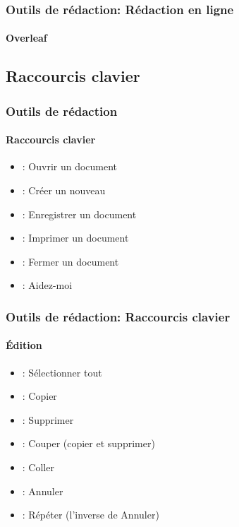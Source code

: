 \documentclass[xcolor=table]{beamer}
\begin{document}
\begin{frame}
\frametitle{Outils de rédaction: Rédaction en ligne}
\framesubtitle{Overleaf}


\end{frame}

\subsection{Raccourcis clavier}

\begin{frame}
\frametitle{Outils de rédaction}
\framesubtitle{Raccourcis clavier}

\begin{itemize}
	\item {}: Ouvrir un document
	\item {}: Créer un nouveau
	\item {}: Enregistrer un document
	\item {}: Imprimer un document 
	\item {}: Fermer un document
	\item {}: Aidez-moi
\end{itemize}

\end{frame}

\begin{frame}
\frametitle{Outils de rédaction: Raccourcis clavier}
\framesubtitle{Édition}

\begin{itemize}
	\item {}: Sélectionner tout
	\item {}: Copier
	\item {}: Supprimer
	\item {}: Couper (copier et supprimer)
	\item {}: Coller
	\item {}: Annuler
	\item {}: Répéter (l'inverse de Annuler)
\end{itemize}

\end{frame}
\end{document}

